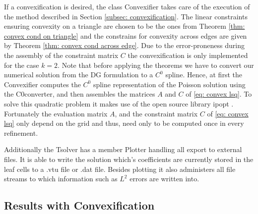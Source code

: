 If a convexification is desired, the class Convexifier takes care of the execution of the method described in Section \ref{subsec: convexification}. The linear constraints ensuring convexity on a triangle are chosen to be the ones from Theorem \ref{thm: convex cond on triangle} and the constrains for convexity across edges are given by Theorem \ref{thm: convex cond across edge}. Due to the error-proneness during the assembly of the constraint matrix $C$ the convexification is only implemented for the case $k=2$.
Note that before applying the theorems we have to convert our numerical solution from the DG formulation to a $C^0$ spline.
Hence, at first the Convexifier computes the $C^0$ spline representation of the Poisson solution using the C0converter, and then assembles the matrices $A$ and $C$ of \eqref{eq: convex lsq}. To solve this quadratic problem it makes use of the open source library ipopt \cite{ipopt}.\\
Fortunately the evaluation matrix $A$, and the constraint matrix $C$ of \eqref{eq: convex lsq} only depend on the grid and thus, need only to be computed once in every refinement.

Additionally the Tsolver has a member Plotter handling all export to external files. It is able to write the solution which's coefficients are currently stored in the leaf cells to a .vtu file or .dat file. Besides plotting it also administers all file streams to which information such as $L^2$ errors are written into.

\subsection{Results with Convexification}

